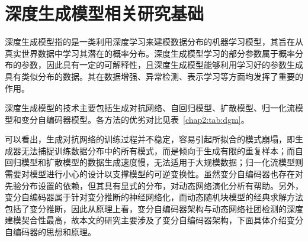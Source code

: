 \section{深度生成模型相关研究基础}

深度生成模型指的是一类利用深度学习来建模数据分布的机器学习模型，其旨在从真实世界数据中学习其潜在的概率分布。深度生成模型学习的部分参数属于概率分布的参数，因此具有一定的可解释性，且深度生成模型能够利用学习好的参数生成具有类似分布的数据。其在数据增强、异常检测、表示学习等方面均发挥了重要的作用\cite{herrmann2024deep,oussidi2018deep}。

深度生成模型的技术主要包括生成对抗网络\cite{goodfellow2020generative}、自回归模型\cite{you2018graphrnn}、扩散模型\cite{kingma2021variational}、归一化流模型\cite{papamakarios2021normalizing}和变分自编码器模型\cite{jiang2024incomplete}。各方法的优劣对比见表~\ref{chap2:tab:dgm}。

\begin{table}[htbp]
	\caption{深度生成模型各技术对比简表}
	\vspace{0.5em}\centering\wuhao
	\label{chap2:tab:dgm}
\end{table}

可以看出，生成对抗网络的训练过程并不稳定，容易引起所拟合的模式崩塌，即生成器无法捕捉训练数据分布中的所有模式，而是倾向于生成有限的重复样本；而自回归模型和扩散模型的数据生成速度慢，无法适用于大规模数据；归一化流模型则需要对模型进行小心的设计以支撑模型的可逆变换性。虽然变分自编码器也存在对先验分布设置的依赖，但其具有显式的分布，对动态网络演化分析有帮助。另外，变分自编码器属于针对变分推断的神经网络化，而动态随机块模型的经典求解方法包括了变分推断，因此从原理上看，变分自编码器架构与动态网络社团检测的深度建模契合性最高，故本文的研究主要涉及了变分自编码器架构，下面具体介绍变分自编码器的思想和原理。

